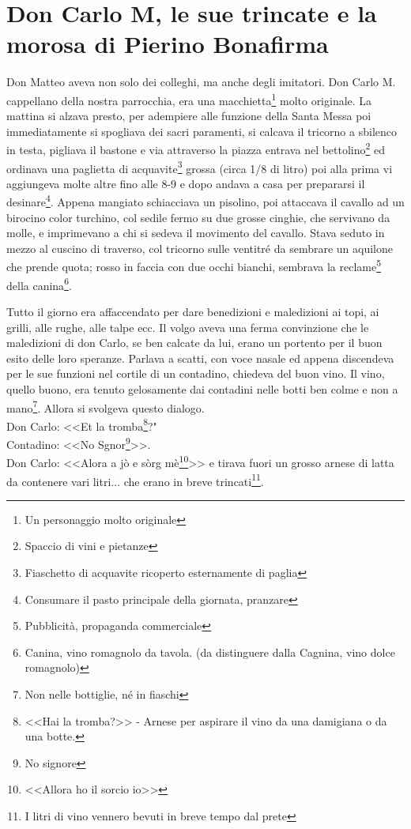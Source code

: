 
\chapter{Don Carlo M, le sue trincate e la morosa di Pierino Bonafirma}
Don Matteo aveva non solo dei colleghi, ma anche degli imitatori. Don Carlo M. cappellano della nostra parrocchia, era una macchietta\footnote{Un personaggio molto originale} molto originale. La mattina si alzava presto, per adempiere alle funzione della Santa Messa poi immediatamente si spogliava dei sacri paramenti, si calcava il tricorno a sbilenco in testa, pigliava il bastone e via attraverso la piazza entrava nel bettolino\footnote{Spaccio di vini e pietanze} ed ordinava una paglietta di acquavite\footnote{Fiaschetto di acquavite ricoperto esternamente di paglia} grossa (circa 1/8 di litro) poi alla prima vi aggiungeva molte altre fino alle 8-9 e dopo andava a casa per prepararsi il desinare\footnote{Consumare il pasto principale della giornata, pranzare}. Appena mangiato schiacciava un pisolino, poi attaccava il cavallo ad un birocino color turchino, col sedile fermo su due grosse cinghie, che servivano da molle, e imprimevano a chi si sedeva il movimento del cavallo. Stava seduto in mezzo al cuscino di traverso, col tricorno sulle ventitré da sembrare un aquilone che prende quota; rosso in faccia con due occhi bianchi, sembrava la reclame\footnote{Pubblicità, propaganda commerciale} della canina\footnote{Canina, vino romagnolo da tavola. (da distinguere dalla Cagnina, vino dolce romagnolo)}.

Tutto il giorno era affaccendato per dare benedizioni e maledizioni ai topi, ai grilli, alle rughe, alle talpe ecc. Il volgo aveva una ferma convinzione che le maledizioni di don Carlo, se ben calcate da lui, erano un portento per il buon esito delle loro speranze. Parlava a scatti, con voce nasale ed appena discendeva per le sue funzioni nel cortile di un contadino, chiedeva del buon vino. Il vino, quello buono, era tenuto gelosamente dai contadini nelle botti ben colme e non a mano\footnote{Non nelle bottiglie, né in fiaschi}. Allora si svolgeva questo dialogo. \\
\indent Don Carlo: <<Et la tromba\footnote{<<Hai la tromba?>> - Arnese per aspirare il vino da una damigiana o da una botte.}?"\\
\indent Contadino: <<No Sgnor\footnote{No signore}>>.\\
\indent Don Carlo: <<Alora a jò e sòrg mè\footnote{<<Allora ho il sorcio io>>}>> e tirava fuori un grosso arnese di latta da contenere vari litri... che erano in breve trincati\footnote{I litri di vino vennero bevuti in breve tempo dal prete}.\\

